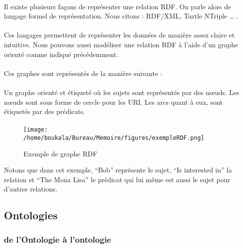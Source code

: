 \documentclass[12pt, a4paper, oneside]{book}
\begin{document}
\paragraph{}
Il existe plusieurs façons de représenter une relation RDF. On parle alors de langage formel de représentation. Nous citons : RDF/XML, Turtle NTriple … .
\paragraph{}
Ces langages permettent de représenter les données de manière assez claire et intuitive.
Nous pouvons aussi modéliser une relation RDF à l'aide d'un graphe orienté comme indiqué précédemment.

\paragraph{}
Ces graphes sont représentés de la manière suivante : 


\paragraph{}
Un graphe orienté et étiqueté où les sujets sont représentés par des nœuds. Les nœuds sont sous forme de cercle pour les URI.
Les arcs quant à eux, sont étiquetés par des prédicats.

\paragraph{}

\begin{figure}[h!]
\begin{center}
\texttt{[image: /home/boukala/Bureau/Memoire/figures/exempleRDF.png]}
\caption{Exemple de graphe RDF}
\end{center}
\end{figure}


Notons que dans cet exemple, “Bob” représente le sujet, “Is interested in” la relation et “The Mona Lisa” le prédicat qui lui même est aussi le sujet  pour d'autres relations.

\subsection{Ontologies}

\subsubsection{de l'Ontologie à l'ontologie}
\end{document}
